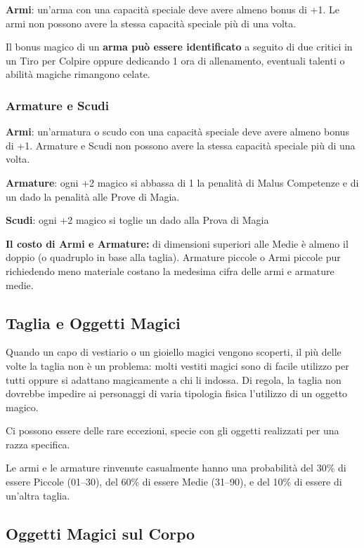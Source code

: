\begin{multicols}{2}
\textbf{Armi}: un'arma con una capacità speciale deve avere almeno bonus di +1. Le armi non possono avere la stessa capacità speciale più di una volta.

Il bonus magico di un \textbf{arma può essere identificato} a seguito di due critici in un Tiro per Colpire oppure dedicando 1 ora di allenamento, eventuali talenti o abilità magiche rimangono celate.

\subsubsection{Armature e Scudi}

\textbf{Armi}: un'armatura o scudo con una capacità speciale deve avere almeno bonus di +1. Armature e Scudi non possono avere la stessa capacità speciale più di una volta.

\textbf{Armature}: ogni +2 magico si abbassa di 1 la penalità di Malus Competenze e di un dado la penalità alle Prove di Magia.

\textbf{Scudi}: ogni +2 magico si toglie un dado alla Prova di Magia

\textbf{Il costo di Armi e Armature:} di dimensioni superiori alle Medie è almeno il doppio (o quadruplo in base alla taglia). Armature piccole o Armi piccole pur richiedendo meno materiale costano la medesima cifra delle armi e armature medie.

\subsection{Taglia e Oggetti Magici}

\label{taglia-e-oggetti-magici}

Quando un capo di vestiario o un gioiello magici vengono scoperti, il più delle volte la taglia non è un problema: molti vestiti magici sono di facile utilizzo per tutti oppure si adattano magicamente a chi li indossa. Di regola, la taglia non dovrebbe impedire ai personaggi di varia tipologia fisica l'utilizzo di un oggetto magico.

Ci possono essere delle rare eccezioni, specie con gli oggetti realizzati per una razza specifica.

Le armi e le armature rinvenute casualmente hanno una probabilità del 30\% di essere Piccole (01--30), del 60\% di essere Medie (31--90), e del 10\% di essere di un'altra taglia.

\subsection{Oggetti Magici sul Corpo}


\end{multicols}
